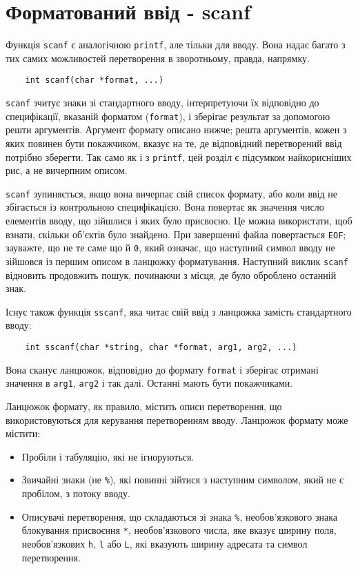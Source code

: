 \documentclass[a4paper,12pt]{book}
\begin{document}
\section{Форматований ввід - scanf}

\label{f0:ch7.4}
  Функція \texttt{scanf} є аналогічною \texttt{printf}, але тільки для вводу. Вона надає
  багато з тих самих можливостей перетворення в зворотньому, правда, напрямку.
  \begin{verbatim}
    int scanf(char *format, ...)
  \end{verbatim}

  \texttt{scanf} зчитує знаки зі стандартного вводу, інтерпретуючи їх відповідно до
  специфікації, вказаній форматом (\texttt{format}), і зберігає результат за допомогою
  решти аргументів. Аргумент формату описано нижче; решта аргументів, кожен з яких повинен
  бути покажчиком, вказує на те, де відповідний перетворений ввід потрібно зберегти. Так
  само як і з \texttt{printf}, цей розділ є підсумком найкорисніших рис, а не
  вичерпним описом.

  \texttt{scanf} зупиняється, якщо вона вичерпає свій список формату, або коли ввід не
  збігається із контрольною специфікацією. Вона повертає як значення число елементів вводу,
  що зійшлися і яких було присвоєно. Це можна використати, щоб взнати, скільки об'єктів
  було знайдено. При завершенні файла повертається \texttt{EOF}; зауважте, що не те саме
  що й \texttt{0}, який означає, що наступний символ вводу не зійшовся із першим описом в
  ланцюжку форматування. Наступний виклик \texttt{scanf} відновить продовжить пошук,
  починаючи з місця, де було оброблено останній знак.

  Існує також функція \texttt{sscanf}, яка читає свій ввід з ланцюжка замість стандартного
  вводу:
  \begin{verbatim}
    int sscanf(char *string, char *format, arg1, arg2, ...)
  \end{verbatim}

  Вона сканує ланцюжок, відповідно до формату \texttt{format} і зберігає отримані значення
  в \texttt{arg1}, \texttt{arg2} і так далі. Останні мають бути покажчиками.

  Ланцюжок формату, як правило, містить описи перетворення, що використовуються для
  керування перетворенням вводу. Ланцюжок формату може містити:
    \begin{itemize}    \item Пробіли і табуляцію, які не ігноруються.
    \item Звичайні знаки (не
    \texttt{\%}), які повинні зійтися з наступним символом, який не є пробілом, з потоку
    вводу.
    \item Описувачі перетворення, що складаються зі знака
    \texttt{\%}, необов'язкового знака блокування присвоєння
    \texttt{*}, необов'язкового числа, яке вказує ширину поля, необов'язкових
    \texttt{h},
    \texttt{l} або
    \texttt{L}, які вказують ширину адресата та символ перетворення.
  \end{itemize}
\end{document}
